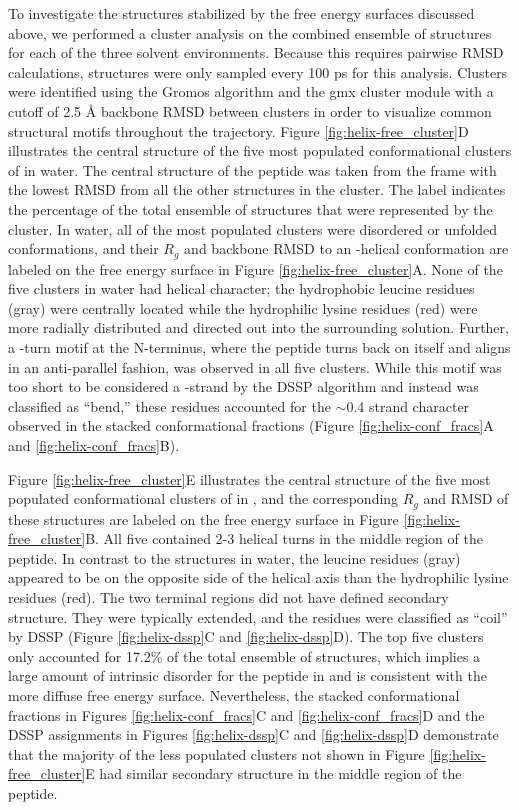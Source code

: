 To investigate the structures stabilized by the free energy surfaces discussed above, we performed a cluster analysis on the combined ensemble of structures for each of the three solvent environments. 
Because this requires pairwise RMSD calculations, structures were only sampled every 100 ps for this analysis. 
Clusters were identified using the Gromos algorithm\cite{Daura1999} and the gmx cluster module with a cutoff of 2.5 \si{\angstrom} backbone RMSD between clusters in order to visualize common structural motifs throughout the trajectory. 
Figure \ref{fig:helix-free_cluster}D illustrates the central structure of the five most populated conformational clusters of \pep{} in water. 
The central structure of the peptide was taken from the frame with the lowest RMSD from all the other structures in the cluster. 
The label indicates the percentage of the total ensemble of structures that were represented by the cluster. 
In water, all of the most populated clusters were disordered or unfolded conformations, and their $R_g$ and backbone RMSD to an \textalpha{}-helical conformation are labeled on the free energy surface in Figure \ref{fig:helix-free_cluster}A. 
None of the five clusters in water had helical character; 
the hydrophobic leucine residues (gray) were centrally located while the hydrophilic lysine residues (red) were more radially distributed and directed out into the surrounding solution. 
Further, a \textbeta{}-turn motif at the N-terminus, where the peptide turns back on itself and aligns in an anti-parallel fashion, was observed in all five clusters. 
While this motif was too short to be considered a \textbeta{}-strand by the DSSP algorithm and instead was classified as ``bend,'' these residues accounted for the $\sim$0.4 strand character observed in the stacked conformational fractions (Figure \ref{fig:helix-conf_fracs}A and \ref{fig:helix-conf_fracs}B).

Figure \ref{fig:helix-free_cluster}E illustrates the central structure of the five most populated conformational clusters of \pep{} in \tbawat{}, and the corresponding $R_g$ and RMSD of these structures are labeled on the free energy surface in Figure \ref{fig:helix-free_cluster}B. 
All five contained 2-3 helical turns in the middle region of the peptide. 
In contrast to the structures in water, the leucine residues (gray) appeared to be on the opposite side of the helical axis than the hydrophilic lysine residues (red). 
The two terminal regions did not have defined secondary structure. 
They were typically extended, and the residues were classified as ``coil'' by DSSP (Figure \ref{fig:helix-dssp}C and \ref{fig:helix-dssp}D). 
The top five clusters only accounted for 17.2\% of the total ensemble of structures, which implies a large amount of intrinsic disorder for the peptide in \tbawat{} and is consistent with the more diffuse free energy surface. 
Nevertheless, the stacked conformational fractions in Figures \ref{fig:helix-conf_fracs}C and \ref{fig:helix-conf_fracs}D and the DSSP assignments in Figures \ref{fig:helix-dssp}C and \ref{fig:helix-dssp}D demonstrate that the majority of the less populated clusters not shown in Figure \ref{fig:helix-free_cluster}E had similar secondary structure in the middle region of the peptide.

